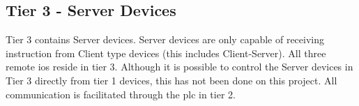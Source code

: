         \subsection{Tier 3 - Server Devices}

        Tier 3 contains Server devices. Server devices are only capable of receiving instruction from Client type devices (this includes Client-Server). All three remote \acrshort{io}s reside in tier 3. Although it is possible to control the Server devices in Tier 3 directly from tier 1 devices, this has not been done on this project. All communication is facilitated through the \acrshort{plc} in tier 2.




    
    
    
    